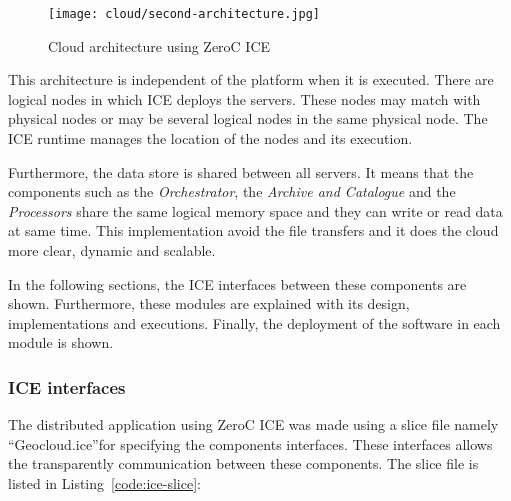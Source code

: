 \begin{figure}[!h]
\begin{center}
\texttt{[image: cloud/second-architecture.jpg]}
\caption{Cloud architecture using ZeroC ICE}
\label{fig:ice-architecture}
\end{center}
\end{figure}

This architecture is independent of the platform when it is executed. There are
logical nodes in which ICE deploys the servers. These nodes may match with
physical nodes or may be several logical nodes in the same physical node. The
ICE runtime manages the location of the nodes and its execution.

Furthermore, the data store is shared between all servers. It means that the
components such as the \emph{Orchestrator}, the \emph{Archive and Catalogue} and the
\emph{Processors} share the same logical memory space and they can write or read data
at same time. This implementation avoid the file transfers and it does the cloud
more clear, dynamic and scalable.

In the following sections, the  ICE interfaces between these components are
shown. Furthermore, these modules are explained with its design,
implementations and executions. Finally, the
deployment of the software in each module is shown.

\subsubsection{ICE interfaces}

The distributed application using ZeroC ICE was made using a slice file namely
``Geocloud.ice''for
specifying the components interfaces. These interfaces allows the transparently
communication between these components. The slice file is listed in Listing~\ref{code:ice-slice}:


